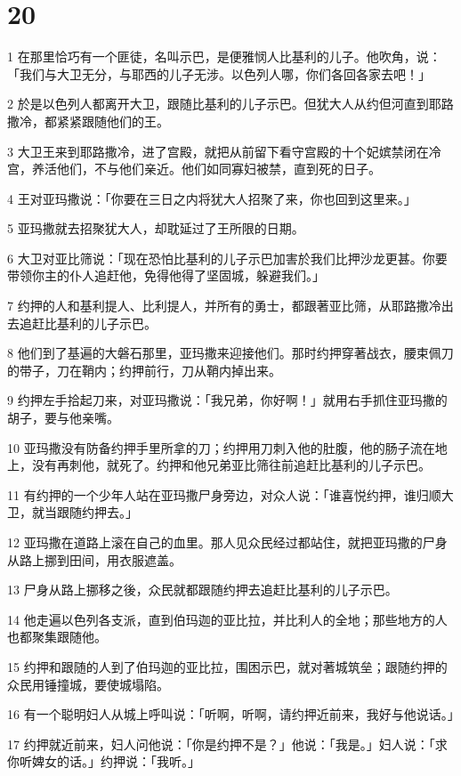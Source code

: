 \chapter{20}

\par 1 在那里恰巧有一个匪徒，名叫示巴，是便雅悯人比基利的儿子。他吹角，说：「我们与大卫无分，与耶西的儿子无涉。以色列人哪，你们各回各家去吧！」
\par 2 於是以色列人都离开大卫，跟随比基利的儿子示巴。但犹大人从约但河直到耶路撒冷，都紧紧跟随他们的王。
\par 3 大卫王来到耶路撒冷，进了宫殿，就把从前留下看守宫殿的十个妃嫔禁闭在冷宫，养活他们，不与他们亲近。他们如同寡妇被禁，直到死的日子。
\par 4 王对亚玛撒说：「你要在三日之内将犹大人招聚了来，你也回到这里来。」
\par 5 亚玛撒就去招聚犹大人，却耽延过了王所限的日期。
\par 6 大卫对亚比筛说：「现在恐怕比基利的儿子示巴加害於我们比押沙龙更甚。你要带领你主的仆人追赶他，免得他得了坚固城，躲避我们。」
\par 7 约押的人和基利提人、比利提人，并所有的勇士，都跟著亚比筛，从耶路撒冷出去追赶比基利的儿子示巴。
\par 8 他们到了基遍的大磐石那里，亚玛撒来迎接他们。那时约押穿著战衣，腰束佩刀的带子，刀在鞘内；约押前行，刀从鞘内掉出来。
\par 9 约押左手拾起刀来，对亚玛撒说：「我兄弟，你好啊！」就用右手抓住亚玛撒的胡子，要与他亲嘴。
\par 10 亚玛撒没有防备约押手里所拿的刀；约押用刀刺入他的肚腹，他的肠子流在地上，没有再刺他，就死了。约押和他兄弟亚比筛往前追赶比基利的儿子示巴。
\par 11 有约押的一个少年人站在亚玛撒尸身旁边，对众人说：「谁喜悦约押，谁归顺大卫，就当跟随约押去。」
\par 12 亚玛撒在道路上滚在自己的血里。那人见众民经过都站住，就把亚玛撒的尸身从路上挪到田间，用衣服遮盖。
\par 13 尸身从路上挪移之後，众民就都跟随约押去追赶比基利的儿子示巴。
\par 14 他走遍以色列各支派，直到伯玛迦的亚比拉，并比利人的全地；那些地方的人也都聚集跟随他。
\par 15 约押和跟随的人到了伯玛迦的亚比拉，围困示巴，就对著城筑垒；跟随约押的众民用锤撞城，要使城塌陷。
\par 16 有一个聪明妇人从城上呼叫说：「听啊，听啊，请约押近前来，我好与他说话。」
\par 17 约押就近前来，妇人问他说：「你是约押不是？」他说：「我是。」妇人说：「求你听婢女的话。」约押说：「我听。」
